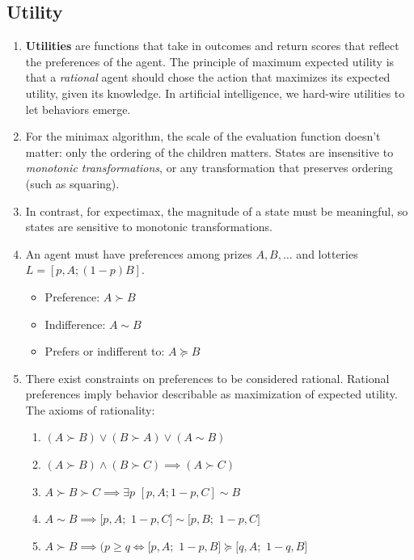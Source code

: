 \documentclass[10pt]{article}
\begin{document}
\begin{multicols}{2}
\begin{enumerate}
    \subsection{Utility}
    \begin{enumerate}
        \item \textbf{Utilities} are functions that take in outcomes and return scores that reflect the preferences of the agent. The principle of maximum expected utility is that a \textit{rational} agent should chose the action that maximizes its expected utility, given its knowledge. In artificial intelligence, we hard-wire utilities to let behaviors emerge.
        \item For the minimax algorithm, the scale of the evaluation function doesn't matter: only the ordering of the children matters. States are insensitive to \textit{monotonic transformations}, or any transformation that preserves ordering (such as squaring).
        \item In contrast, for expectimax, the magnitude of a state must be meaningful, so states are sensitive to monotonic transformations.
        \item An agent must have preferences among prizes $A, B,\hdots$ and lotteries $L=[p,A;(1-p)B]$. 
        \begin{itemize}
            \item Preference: $A \succ B$
            \item Indifference: $A \sim B$
            \item Prefers or indifferent to: $A \succeq B$
        \end{itemize}
        \item There exist constraints on preferences to be considered rational. Rational preferences imply behavior describable as maximization of expected utility. The axioms of rationality:
        \begin{enumerate}
            \item $(A \succ B) \lor (B \succ A) \lor (A \sim B)$
            \item $(A \succ B) \land (B \succ C) \implies (A \succ C)$
            \item $A \succ B \succ C \implies \exists p$ $[p,A;1-p,C] \sim B$
            \item $A \sim B \implies [p,A;$ $1-p,C] \sim [p,B;$ $1-p,C]$
            \item $A \succ B \implies (p \geq q \iff [p,A;$ $1-p,B] \succeq [q,A;$ $1-q,B]$
        \end{enumerate}

\end{enumerate}
\end{enumerate}
\end{multicols}
\end{document}
